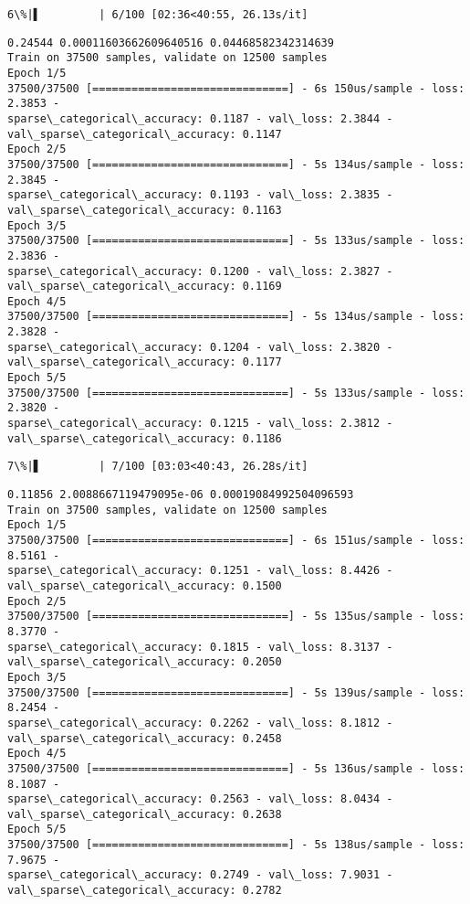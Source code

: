 \documentclass[11pt]{article}
\begin{document}
    \begin{Verbatim}[commandchars=\\\{\}]
  6\%|▌         | 6/100 [02:36<40:55, 26.13s/it]
    \end{Verbatim}

    \begin{Verbatim}[commandchars=\\\{\}]
0.24544 0.00011603662609640516 0.04468582342314639
Train on 37500 samples, validate on 12500 samples
Epoch 1/5
37500/37500 [==============================] - 6s 150us/sample - loss: 2.3853 -
sparse\_categorical\_accuracy: 0.1187 - val\_loss: 2.3844 -
val\_sparse\_categorical\_accuracy: 0.1147
Epoch 2/5
37500/37500 [==============================] - 5s 134us/sample - loss: 2.3845 -
sparse\_categorical\_accuracy: 0.1193 - val\_loss: 2.3835 -
val\_sparse\_categorical\_accuracy: 0.1163
Epoch 3/5
37500/37500 [==============================] - 5s 133us/sample - loss: 2.3836 -
sparse\_categorical\_accuracy: 0.1200 - val\_loss: 2.3827 -
val\_sparse\_categorical\_accuracy: 0.1169
Epoch 4/5
37500/37500 [==============================] - 5s 134us/sample - loss: 2.3828 -
sparse\_categorical\_accuracy: 0.1204 - val\_loss: 2.3820 -
val\_sparse\_categorical\_accuracy: 0.1177
Epoch 5/5
37500/37500 [==============================] - 5s 133us/sample - loss: 2.3820 -
sparse\_categorical\_accuracy: 0.1215 - val\_loss: 2.3812 -
val\_sparse\_categorical\_accuracy: 0.1186
    \end{Verbatim}

    \begin{Verbatim}[commandchars=\\\{\}]
  7\%|▋         | 7/100 [03:03<40:43, 26.28s/it]
    \end{Verbatim}

    \begin{Verbatim}[commandchars=\\\{\}]
0.11856 2.0088667119479095e-06 0.00019084992504096593
Train on 37500 samples, validate on 12500 samples
Epoch 1/5
37500/37500 [==============================] - 6s 151us/sample - loss: 8.5161 -
sparse\_categorical\_accuracy: 0.1251 - val\_loss: 8.4426 -
val\_sparse\_categorical\_accuracy: 0.1500
Epoch 2/5
37500/37500 [==============================] - 5s 135us/sample - loss: 8.3770 -
sparse\_categorical\_accuracy: 0.1815 - val\_loss: 8.3137 -
val\_sparse\_categorical\_accuracy: 0.2050
Epoch 3/5
37500/37500 [==============================] - 5s 139us/sample - loss: 8.2454 -
sparse\_categorical\_accuracy: 0.2262 - val\_loss: 8.1812 -
val\_sparse\_categorical\_accuracy: 0.2458
Epoch 4/5
37500/37500 [==============================] - 5s 136us/sample - loss: 8.1087 -
sparse\_categorical\_accuracy: 0.2563 - val\_loss: 8.0434 -
val\_sparse\_categorical\_accuracy: 0.2638
Epoch 5/5
37500/37500 [==============================] - 5s 138us/sample - loss: 7.9675 -
sparse\_categorical\_accuracy: 0.2749 - val\_loss: 7.9031 -
val\_sparse\_categorical\_accuracy: 0.2782
    \end{Verbatim}
\end{document}
